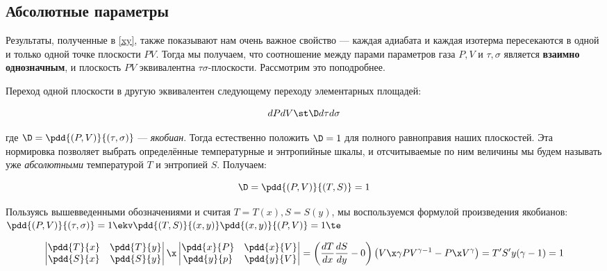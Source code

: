 \documentclass[12pt]{kiarticle}
\begin{document}
\subsection{Абсолютные параметры}

Результаты, полученные в \eqref{xy}, также показывают нам очень важное свойство --- каждая адиабата и каждая изотерма пересекаются в одной и только одной точке плоскости $ PV $. Тогда мы получаем, что соотношение между парами параметров газа $ P, V $ и $ \tau, \sigma $ является \textbf{взаимно однозначным}, и плоскость $ PV $  эквивалентна $ \tau \sigma $-плоскости. Рассмотрим это поподробнее.

Переход одной плоскости в другую эквивалентен следующему переходу элементарных площадей: 

\begin{equation}\label{}
dP dV \st \D d\tau d\sigma
\end{equation}

где $ \D  = \pdd{(P, V)}{(\tau, \sigma)} $ --- \textit{якобиан}. Тогда естественно положить $ \D = 1 $ для полного равноправия наших плоскостей. Эта нормировка позволяет выбрать определённые температурные и энтропийные шкалы, и отсчитываемые по ним величины мы будем называть уже \textit{абсолютными} температурой $ T $ и энтропией $ S $. Получаем:

\begin{equation}\label{D}
\D  = \pdd{(P, V)}{(T, S)} = 1
\end{equation}

Пользуясь вышевведенными обозначениями и считая $ T = T(x), S = S(y) $, мы воспользуемся формулой произведения якобианов: $  \pdd{(P, V)}{(\tau, \sigma)} = 1 \ekv  \pdd{(T, S)}{(x, y)} \pdd{(x, y)}{(P, V)} = 1 \te$

\begin{equation}\label{DD}
\begin{vmatrix}
\pdd{T}{x} & \pdd{T}{y} \\
\pdd{S}{x} & \pdd{S}{y} \\
\end{vmatrix} 
\x
\begin{vmatrix}
\pdd{x}{P} & \pdd{x}{V} \\
\pdd{y}{p} & \pdd{y}{V} \\
\end{vmatrix}
=
\left( \dfrac{dT}{dx} \dfrac{dS}{dy} - 0\right) \left( V\x \gamma PV^{\gamma - 1} - P\x V^\gamma\right) = T' S' y(\gamma - 1) = 1
\end{equation}
\end{document}
